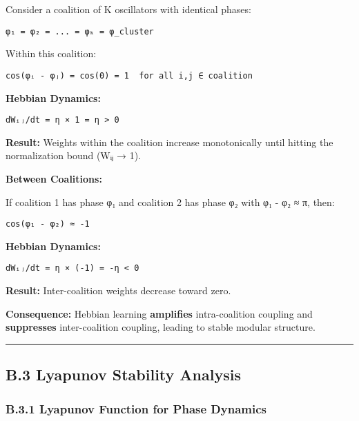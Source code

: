 \documentclass[
]{article}
\begin{document}
Consider a coalition of K oscillators with identical phases:

\begin{verbatim}
φ₁ = φ₂ = ... = φₖ = φ_cluster
\end{verbatim}

Within this coalition:

\begin{verbatim}
cos(φᵢ - φⱼ) = cos(0) = 1  for all i,j ∈ coalition
\end{verbatim}

\textbf{Hebbian Dynamics:}

\begin{verbatim}
dWᵢⱼ/dt = η × 1 = η > 0
\end{verbatim}

\textbf{Result:} Weights within the coalition increase monotonically
until hitting the normalization bound (Wᵢⱼ → 1).

\textbf{Between Coalitions:}

If coalition 1 has phase φ₁ and coalition 2 has phase φ₂ with
\textbar φ₁ - φ₂\textbar{} ≈ π, then:

\begin{verbatim}
cos(φ₁ - φ₂) ≈ -1
\end{verbatim}

\textbf{Hebbian Dynamics:}

\begin{verbatim}
dWᵢⱼ/dt = η × (-1) = -η < 0
\end{verbatim}

\textbf{Result:} Inter-coalition weights decrease toward zero.

\textbf{Consequence:} Hebbian learning \textbf{amplifies}
intra-coalition coupling and \textbf{suppresses} inter-coalition
coupling, leading to stable modular structure.

\begin{center}\rule{0.5\linewidth}{0.5pt}\end{center}

\subsection{B.3 Lyapunov Stability
Analysis}\label{b.3-lyapunov-stability-analysis}

\subsubsection{B.3.1 Lyapunov Function for Phase
Dynamics}\label{b.3.1-lyapunov-function-for-phase-dynamics}
\end{document}
